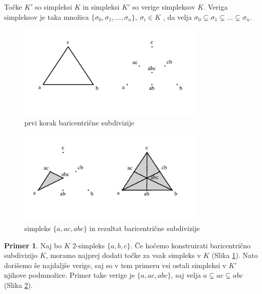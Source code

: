 \documentclass[a4paper, 12pt]{book}
\theoremstyle{definition}
\newtheorem{example}{Primer}[section]
\theoremstyle{remark}
\begin{document}
Točke $K'$ so simpleksi $K$ in simpleksi $K'$ so verige simpleksov $K$. Veriga
simpleksov je taka množica $\{\sigma_0,\sigma_1,\dots,\sigma_n\},\ \sigma_i \in K$
, da velja $\sigma_0 \subsetneq \sigma_1 \subsetneq \dots \subsetneq \sigma_n$.
\newpage
\begin{figure}[h]
  \begin{center}
  \includegraphics[width=0.8\textwidth]{baricentricna1.pdf}
  \end{center}
  \caption{prvi korak baricentrične subdivizije}
  \label{baricent1}
\end{figure}
\begin{figure}[h]
  \begin{center}
  \includegraphics[width=0.8\textwidth]{baricentricna2.pdf}
  \end{center}
  \caption{simpleks $\{a, ac, abc\}$ in rezultat baricentrične subdivizije}
  \label{baricent2}
\end{figure}
\begin{example}
  Naj bo $K$ 2-simpleks $\{a,b,c\}$. Če hočemo konstruirati baricentrično subdivizijo $K$,
  moramo najprej dodati točke za vsak simpleks v $K$ (Slika \ref{baricent1}).
  Nato dorišemo še najdaljše verige, saj so v tem primeru vsi ostali simpleksi v $K'$ njihove podmnožice.
  Primer take verige je $\{a, ac, abc\}$, saj velja $a \subsetneq ac \subsetneq abc$ (Slika \ref{baricent2}).
\end{example}
\end{document}
